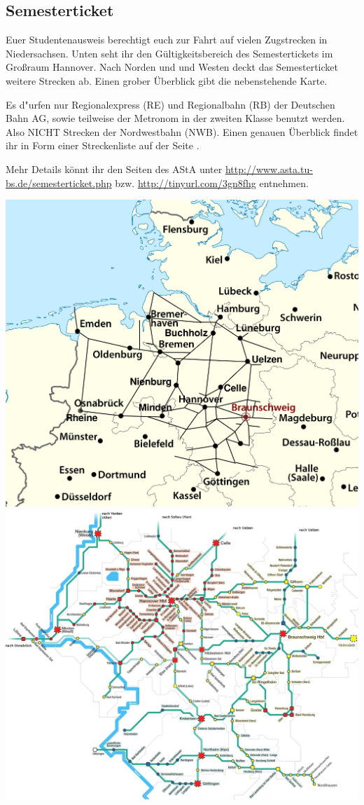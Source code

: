 \begin{multicols}{2}
\subsection{Semesterticket}
	Euer Studentenausweis berechtigt euch zur Fahrt auf vielen Zugstrecken in Niedersachsen. Unten seht ihr den Gültigkeitsbereich des Semestertickets im Großraum Hannover. Nach Norden und und Westen deckt das Semesterticket weitere Strecken ab. Einen grober Überblick gibt die nebenstehende Karte. 

	Es d"urfen nur Regionalexpress (RE) und Regionalbahn (RB) der Deutschen Bahn AG, sowie teilweise der Metronom in der zweiten Klasse benutzt werden. Also NICHT Strecken der Nordwestbahn (NWB). Einen genauen Überblick findet ihr in Form einer Streckenliste auf der Seite \pageref{streckenliste1}.

	Mehr Details könnt ihr den Seiten des AStA unter \url{http://www.asta.tu-bs.de/semesterticket.php} bzw. \url{http://tinyurl.com/3gn8fhg} entnehmen.
\end{multicols}
\newpage
\includegraphics[width=\columnwidth]{bilder/ticket_deutschland.png}
\newpage
\includegraphics[width=\textwidth]{bilder/ticket_bis_11_Dezember.jpg}
\newpage
